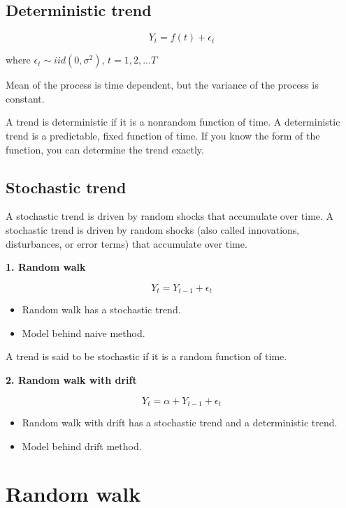 \documentclass[
  11pt,
  a4paper,
]{report}
\begin{document}
\subsection{Deterministic trend}\label{deterministic-trend}

\[Y_t  = f(t) + \epsilon_t\]

where \(\epsilon_t \sim iid(0, \sigma^2)\), \(t = 1, 2, ...T\)

Mean of the process is time dependent, but the variance of the process
is constant.

A trend is deterministic if it is a nonrandom function of time. A
deterministic trend is a predictable, fixed function of time. If you
know the form of the function, you can determine the trend exactly.

\subsection{Stochastic trend}\label{stochastic-trend}

A stochastic trend is driven by random shocks that accumulate over time.
A stochastic trend is driven by random shocks (also called innovations,
disturbances, or error terms) that accumulate over time.

\textbf{1. Random walk}

\[Y_t = Y_{t-1} + \epsilon_t\]

\begin{itemize}
\item
  Random walk has a stochastic trend.
\item
  Model behind naive method.
\end{itemize}

A trend is said to be stochastic if it is a random function of time.

\textbf{2. Random walk with drift}

\[Y_t = \alpha +  Y_{t-1} + \epsilon_t\]

\begin{itemize}
\item
  Random walk with drift has a stochastic trend and a deterministic
  trend.
\item
  Model behind drift method.
\end{itemize}

\section{Random walk}\label{random-walk-1}
\end{document}
